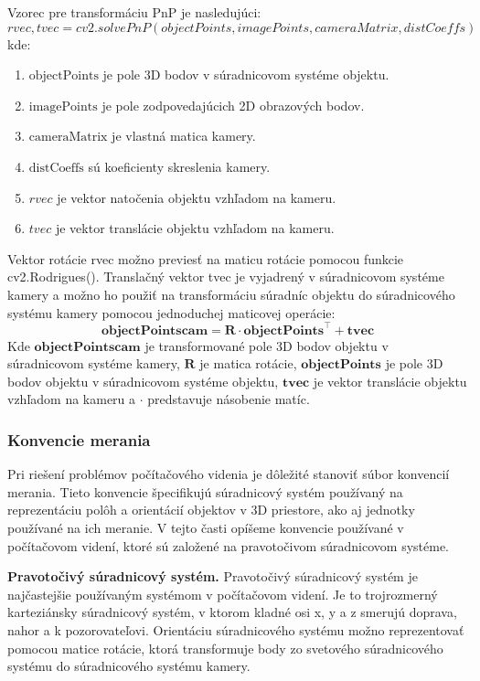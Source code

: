 {Vzorec pre transformáciu PnP je nasledujúci:
\begin{equation}
    rvec, tvec = cv2.solvePnP(objectPoints, imagePoints, cameraMatrix, distCoeffs)
\end{equation}
kde:
\begin{enumerate}
\item $\text{objectPoints}$ je pole 3D bodov v súradnicovom systéme objektu.
\item $\text{imagePoints}$ je pole zodpovedajúcich 2D obrazových bodov.
\item $\text{cameraMatrix}$ je vlastná matica kamery.
\item $\text{distCoeffs}$ sú koeficienty skreslenia kamery.
\item $rvec$ je vektor natočenia objektu vzhľadom na kameru.
\item $tvec$ je vektor translácie objektu vzhľadom na kameru.
\end{enumerate}

Vektor rotácie rvec možno previesť na maticu rotácie pomocou funkcie cv2.Rodrigues(). Translačný vektor tvec je vyjadrený v súradnicovom systéme kamery a možno ho použiť na transformáciu súradníc objektu do súradnicového systému kamery pomocou jednoduchej maticovej operácie:
\begin{equation}
    \textbf{objectPoints}{\textbf{cam}} = \textbf{R} \cdot \textbf{objectPoints}^{\top} + \textbf{t}{\textbf{vec}}
    \end{equation}
Kde $\textbf{objectPoints}{\textbf{cam}}$ je transformované pole 3D bodov objektu v súradnicovom systéme kamery, $\textbf{R}$ je matica rotácie, $\textbf{objectPoints}$ je pole 3D bodov objektu v súradnicovom systéme objektu, $\textbf{t}{\textbf{vec}}$ je vektor translácie objektu vzhľadom na kameru a $\cdot$ predstavuje násobenie matíc.

\subsubsection{Konvencie merania}
Pri riešení problémov počítačového videnia je dôležité stanoviť súbor konvencií merania. Tieto konvencie špecifikujú súradnicový systém používaný na reprezentáciu polôh a orientácií objektov v 3D priestore, ako aj jednotky používané na ich meranie. V tejto časti opíšeme konvencie používané v počítačovom videní, ktoré sú založené na pravotočivom súradnicovom systéme.

\textbf{Pravotočivý súradnicový systém.} Pravotočivý súradnicový systém je najčastejšie používaným systémom v počítačovom videní. Je to trojrozmerný karteziánsky súradnicový systém, v ktorom kladné osi x, y a z smerujú doprava, nahor a k pozorovateľovi. Orientáciu súradnicového systému možno reprezentovať pomocou matice rotácie, ktorá transformuje body zo svetového súradnicového systému do súradnicového systému kamery.

}
